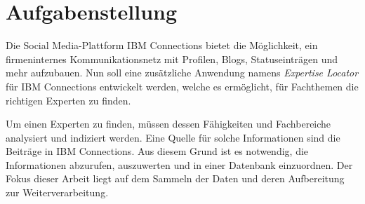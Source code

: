 
\chapter{Aufgabenstellung}
Die Social Media-Plattform IBM Connections bietet die Möglichkeit, ein firmeninternes Kommunikationsnetz mit Profilen, Blogs, Statuseinträgen und mehr aufzubauen. Nun soll eine zusätzliche Anwendung namens \textit{Expertise Locator} für IBM Connections entwickelt werden, welche es ermöglicht, für Fachthemen die richtigen Experten zu finden.

Um einen Experten zu finden, müssen dessen Fähigkeiten und Fachbereiche analysiert und indiziert werden. Eine Quelle für solche Informationen sind die Beiträge in IBM Connections. Aus diesem Grund ist es notwendig, die Informationen abzurufen, auszuwerten und in einer Datenbank einzuordnen. Der Fokus dieser Arbeit liegt auf dem Sammeln der Daten und deren Aufbereitung zur Weiterverarbeitung.
\newpage